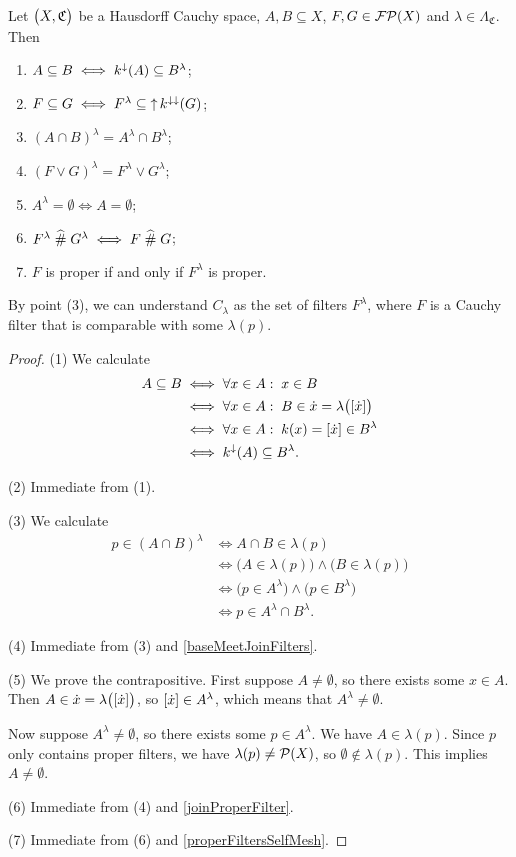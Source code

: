 \begin{lemma} \label{hausdorffCauchyCompletionLemma}
Let $\sSet[\big]{X, \mathfrak{C}}$ be a Hausdorff Cauchy space, $A,B\subseteq X$, $F, G\in \operatorname{\mathcal{FP}}(X)$ and $\lambda \in \Lambda_\mathfrak{C}$. Then
\begin{enumerate}
\item $A \subseteq B \iff k^\downarrow(A)\subseteq B^\lambda$;
\item $F\subseteq G \iff F^\lambda \subseteq \operatorname{\uparrow} k^{\downarrow\downarrow}(G)$;
\item $(A \cap B)^\lambda = A^\lambda \cap B^{\lambda}$;
\item $(F\vee G)^\lambda = F^\lambda \vee G^\lambda$;
\item $A^\lambda = \emptyset \iff A = \emptyset$;
\item $F^\lambda\mathrel{\widehat{\#}} G^\lambda \iff F\mathrel{\widehat{\#}} G$;
\item $F$ is proper \textup{if and only if} $F^\lambda$ is proper.
\end{enumerate}
\end{lemma}
By point (3), we can understand $C_\lambda$ as the set of filters $F^\lambda$, where $F$ is a Cauchy filter that is comparable with some $\lambda(p)$.
\begin{proof}
(1) We calculate
\begin{align*}
A \subseteq B &\iff \forall x\in A: \; x\in B \\
&\iff \forall x\in A: \; B\in \dot{x} = \lambda\big([\dot{x}]\big) \\
&\iff \forall x\in A: \; k(x) = [\dot{x}] \in B^\lambda \\
&\iff k^\downarrow(A) \subseteq B^\lambda.
\end{align*}

(2) Immediate from (1).

(3) We calculate
\begin{align*}
p \in (A\cap B)^\lambda &\iff A\cap B \in \lambda(p) \\
&\iff \big(A \in \lambda(p)\big) \land \big(B \in \lambda(p)\big) \\
&\iff \big(p \in A^\lambda\big) \land \big(p\in B^\lambda\big) \\
&\iff p \in A^\lambda \cap B^\lambda.
\end{align*}

(4) Immediate from (3) and \ref{baseMeetJoinFilters}.

(5) We prove the contrapositive. First suppose $A \neq \emptyset$, so there exists some $x\in A$. Then $A\in \dot{x} = \lambda\big([\dot{x}]\big)$, so $[\dot{x}] \in A^\lambda$, which means that $A^\lambda \neq \emptyset$.

Now suppose $A^\lambda \neq \emptyset$, so there exists some $p\in A^\lambda$. We have $A\in \lambda(p)$. Since $p$ only contains proper filters, we have $\lambda(p) \neq \operatorname{\mathcal{P}}(X)$, so $\emptyset \notin \lambda(p)$. This implies $A \neq \emptyset$.

(6) Immediate from (4) and \ref{joinProperFilter}.

(7) Immediate from (6) and \ref{properFiltersSelfMesh}.
\end{proof}

